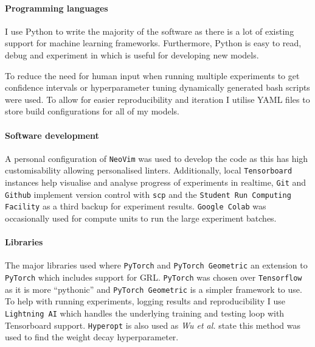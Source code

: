 \paragraph{Programming languages}
I use Python to write the majority of the software as there is a lot of existing support for machine learning frameworks.
Furthermore, Python is easy to read, debug and experiment in which is useful for developing new models.

To reduce the need for human input when running multiple experiments to get confidence intervals or hyperparameter tuning dynamically generated bash scripts were used.
To allow for easier reproducibility and iteration I utilise YAML files to store build configurations for all of my models.

\paragraph{Software development}

A personal configuration of \texttt{NeoVim} was used to develop the code as this has high customisability allowing personalised linters.
Additionally, local \texttt{Tensorboard}\cite{tensorflow2015-whitepaper} instances help visualise and analyse progress of experiments in realtime, \texttt{Git} and \texttt{Github} implement version control with \texttt{scp} and the \texttt{Student Run Computing Facility} as a third backup for experiment results.
\texttt{Google Colab} was occasionally used for compute units to run the large experiment batches.

\paragraph{Libraries}
\label{sec:libraries}

The major libraries used where \texttt{PyTorch} \cite{paszke2019pytorch} and \texttt{PyTorch Geometric} \cite{Fey/Lenssen/2019} an extension to \texttt{PyTorch} which includes support for GRL.
\texttt{PyTorch} was chosen over \texttt{Tensorflow}\cite{tensorflow2015-whitepaper} as it is more ``pythonic'' and \texttt{PyTorch Geometric} is a simpler framework to use.
To help with running experiments, logging results and reproducibility I use \texttt{Lightning AI} which handles the underlying training and testing loop with Tensorboard support.
\texttt{Hyperopt}\cite{bergstra2013making} is also used as \textit{Wu et al.}\cite{wu2019simplifying} state this method was used to find the weight decay hyperparameter.

